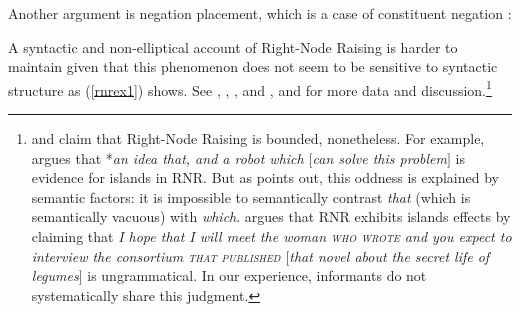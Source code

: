 \documentclass[output=paper
                ,modfonts
                ,nonflat
	        ,collection
	        ,collectionchapter
	        ,collectiontoclongg
 	        ,biblatex
                ,babelshorthands
                ,newtxmath
                ,draftmode
                ,colorlinks, citecolor=brown
]{./langsci/langscibook}
\begin{document}
\begin{exe}
\ex 
\begin{xlista}


\end{xlista}
\end{exe}

\noindent
Another argument is negation placement, which is a case of constituent negation
\citep[253]{Mouret:06}: 

\begin{exe}
 \ex 
 \begin{xlista}
\end{xlista}
\end{exe}


A syntactic and non-elliptical account of Right-Node Raising is harder to maintain given that this phenomenon does not seem to be sensitive to  syntactic structure as (\ref{rnrex1}) shows. See 
\citet{bresnan74},
 \citet[299]{wexlercull},  \citet[45]{grosu81},
 and \citet{
mccawley},  and \citet[382,ft.30]{sab}
for more data and discussion.\footnote{\citet{
steedman85,gapsteed,steedmanbook}
and \citet[183]{dowty88} claim that
Right-Node Raising is bounded, nonetheless.
For example, \citet{
dowty88} argues that  *\emph{an idea that, and a robot which $[$can solve this problem$]$} is  evidence for islands in RNR. But as \citet[95]{phil}
 points out, this oddness is explained by semantic factors: it is impossible to   semantically contrast \emph{that} (which is semantically vacuous) with \emph{which}.
 \citet[17]{steedmanbook}   argues that RNR
exhibits islands effects by claiming that \emph{I hope that I will meet the woman
\textsc{who wrote} and you expect to interview the
consortium \textsc{that published} $[$that
novel about the secret life of legumes$]$} is ungrammatical.
In our experience, informants do not systematically share this judgment.}
\end{document}
